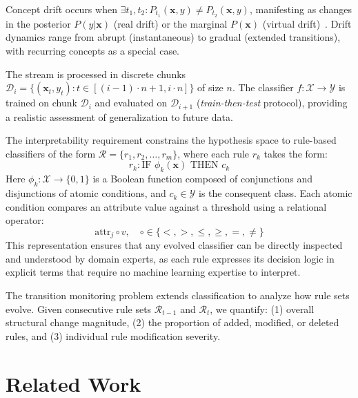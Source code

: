 \documentclass[lettersize,journal]{IEEEtran}
\begin{document}
Concept drift occurs when $\exists t_1, t_2: P_{t_1}(\mathbf{x}, y) \neq P_{t_2}(\mathbf{x}, y)$, manifesting as changes in the posterior $P(y|\mathbf{x})$ (real drift) or the marginal $P(\mathbf{x})$ (virtual drift)~\cite{gama2014survey}. Drift dynamics range from abrupt (instantaneous) to gradual (extended transitions), with recurring concepts as a special case.

The stream is processed in discrete chunks $\mathcal{D}_i = \{(\mathbf{x}_t, y_t) : t \in [(i-1) \cdot n + 1, i \cdot n]\}$ of size $n$. The classifier $f: \mathcal{X} \rightarrow \mathcal{Y}$ is trained on chunk $\mathcal{D}_i$ and evaluated on $\mathcal{D}_{i+1}$ (\emph{train-then-test} protocol), providing a realistic assessment of generalization to future data.

The interpretability requirement constrains the hypothesis space to rule-based classifiers of the form $\mathcal{R} = \{r_1, r_2, \ldots, r_m\}$, where each rule $r_k$ takes the form:
\begin{equation}
    r_k: \text{IF } \phi_k(\mathbf{x}) \text{ THEN } c_k
\end{equation}
Here $\phi_k: \mathcal{X} \rightarrow \{0, 1\}$ is a Boolean function composed of conjunctions and disjunctions of atomic conditions, and $c_k \in \mathcal{Y}$ is the consequent class. Each atomic condition compares an attribute value against a threshold using a relational operator:
\begin{equation}
    \text{attr}_j \circ v, \quad \circ \in \{<, >, \leq, \geq, =, \neq\}
\end{equation}
This representation ensures that any evolved classifier can be directly inspected and understood by domain experts, as each rule expresses its decision logic in explicit terms that require no machine learning expertise to interpret.

The transition monitoring problem extends classification to analyze how rule sets evolve. Given consecutive rule sets $\mathcal{R}_{t-1}$ and $\mathcal{R}_t$, we quantify: (1) overall structural change magnitude, (2) the proportion of added, modified, or deleted rules, and (3) individual rule modification severity.


\section{Related Work}
\label{sec:related}
\end{document}
